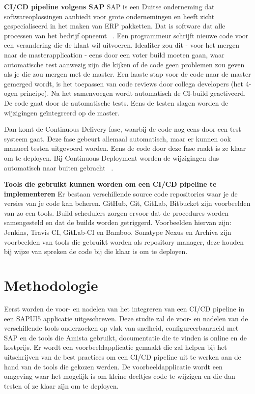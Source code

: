 \large{\textbf{CI/CD pipeline volgens SAP}}
\newline{}
SAP is een Duitse onderneming dat softwareoplossingen aanbiedt voor grote ondernemingen en heeft zicht gespecialiseerd in het maken van ERP pakketten. Dat is software dat alle processen van het bedrijf opneemt ~\autocite{SAPERP2019}.
Een programmeur schrijft nieuwe code voor een verandering die de klant wil uitvoeren. Idealiter zou dit - voor het mergen naar de masterapplication - eens door een voter build moeten gaan, waar automatische test aanwezig zijn die kijken of de code geen problemen zou geven als je die zou mergen met de master. Een laaste stap voor de code naar de master gemerged wordt, is het toepassen van code reviews door collega developers (het 4-ogen principe).
Na het samenvoegen wordt automatisch de CI-build geactiveerd. De code gaat door de automatische tests. Eens de testen slagen worden de wijzigingen geïntegreerd op de master. 

Dan komt de Continuous Delivery fase, waarbij de code nog eens door een test systeem gaat. Deze fase gebeurt allemaal automatisch, maar er kunnen ook manueel testen uitgevoerd worden. Eens de code door deze fase raakt is ze klaar om te deployen. 
Bij Continuous Deployment worden de wijzigingen dus automatisch naar buiten gebracht ~\autocite{Kramer2018}.

\large{\textbf{Tools die gebruikt kunnen worden om een CI/CD pipeline te implementeren}}
    \newline
    Er bestaan verschillende source code repositories waar je de versies van je code kan beheren. GitHub, Git, GitLab, Bitbucket zijn voorbeelden van zo een tools.
    Build schedulers zorgen ervoor dat de procedures worden samengesteld en dat de builds worden getriggerd. Voorbeelden hiervan zijn: Jenkins, Travis CI, GitLab-CI en Bamboo. Sonatype Nexus en Archiva zijn voorbeelden van tools die gebruikt worden als repository manager, deze houden bij wijze van spreken de code bij die klaar is om te deployen.
    
    \section{Methodologie}
    \label{sec:methodologie}
    
    Eerst worden de voor- en nadelen van het integreren van een CI/CD pipeline in een SAPUI5 applicatie uitgeschreven. 
    Deze studie zal de voor- en nadelen van de verschillende tools onderzoeken op vlak van snelheid, configureerbaarheid met SAP en de tools die Amista gebruikt, documentatie die te vinden is online en de kostprijs.
    Er wordt een voorbeeldapplicatie gemaakt die zal helpen bij het uitschrijven van de best practices om een CI/CD pipeline uit te werken aan de hand van de tools die gekozen werden.
    De voorbeeldapplicatie wordt een omgeving waar het mogelijk is om kleine deeltjes code te wijzigen en die dan testen of ze klaar zijn om te deployen.
    
